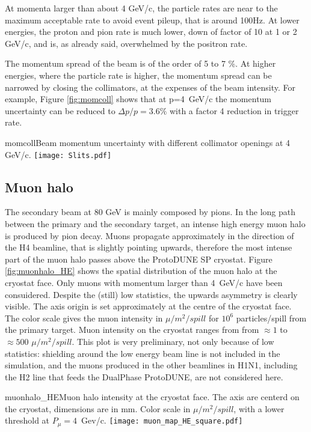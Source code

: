 At momenta larger than about 4 GeV/c, the particle rates are near to the
maximum acceptable rate to avoid event pileup, that is around
100Hz.  At lower energies, the proton and pion rate is much lower, down
of  factor of 10 at 1 or 2 GeV/c, and is, as already said, overwhelmed
by the positron rate.

The momentum spread of the beam is of the order of 5 to 7 \%. At higher energies, where
the particle rate is higher, the momentum spread  can be narrowed by
closing the collimators, at the expenses of the beam intensity.  For example, Figure \ref{fig:momcoll} shows
that at p=4~GeV/c the momentum uncertainty can be  reduced to $\Delta p/p= 3.6\%$ with a factor 4 reduction in trigger rate.  
\begin{cdrfigure}{momcoll}{Beam momentum uncertainty with different collimator openings at 4 GeV/c.}
  \texttt{[image: Slits.pdf]}
\end{cdrfigure}

\subsection{Muon halo}
The secondary beam at 80 GeV is mainly composed by pions. In the long path  between the primary and the secondary target, an intense high energy muon halo is produced by pion decay. Muons propagate approximately in the direction of the H4 beamline, that is slightly pointing upwards, therefore the most intense part of the muon halo passes above the ProtoDUNE SP cryostat. 
Figure \ref{fig:muonhalo_HE} shows the spatial distribution of the muon halo at the cryostat face. Only muons with momentum larger than 4~GeV/c have been consuidered. Despite the (still) low statistics, the upwards asymmetry is clearly visible. The axis origin is set approximately at the centre of the cryostat face. The color scale gives the muon intensity in $\mu /m^2/spill$ for $10^6$ particles/spill from the primary target. Muon intensity on the cryostat ranges from  from $\approx 1$ to $\approx 500 $ $\mu /m^2/spill$.
This plot is very preliminary, not only because of low statistics: shielding around the low energy beam line is not included in the simulation, and the muons produced in the other beamlines in H1N1, including the H2 line that feeds the DualPhase ProtoDUNE, are not considered here. 
\begin{cdrfigure}{muonhalo_HE}{Muon halo intensity at the cryostat face. The axis are centerd on the cryostat, dimensions are in mm. Color scale  in $\mu /m^2/spill$, with a lower threshold at $P_\mu = 4$~Gev/c.}
\texttt{[image: muon\_map\_HE\_square.pdf]}
\end{cdrfigure}





